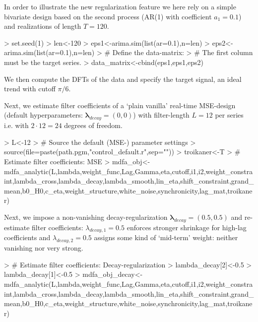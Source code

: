 \documentclass[a4paper]{book}
\begin{document}
In order to illustrate the new regularization feature we here rely on a simple bivariate design based on the second process (AR(1) with coefficient $a_1=0.1$) and realizations of length $T=120$. 
\begin{Schunk}
\begin{Sinput}
> set.seed(1)
> len<-120
> eps1<-arima.sim(list(ar=0.1),n=len)
> eps2<-arima.sim(list(ar=0.1),n=len)
> # Define the data-matrix:
> # The first column must be the target series. 
> data_matrix<-cbind(eps1,eps1,eps2)
\end{Sinput}
\end{Schunk}
We then compute the DFTs of the data and specify the target signal, an ideal trend with cutoff $\pi/6$.
\begin{Schunk}
\end{Schunk}
Next, we estimate filter coefficients of a `plain vanilla' real-time MSE-design (default hyperparameters: $\boldsymbol{\lambda}_{decay}=(0,0)$) with filter-length $L=12$ per series i.e. with $2=24$ degrees of freedom. 
\begin{Schunk}
\begin{Sinput}
> L<-12
> # Source the default (MSE-) parameter settings
> source(file=paste(path.pgm,"control_default.r",sep=""))
> troikaner<-T
> # Estimate filter coefficients: MSE
> mdfa_obj<-mdfa_analytic(L,lambda,weight_func,Lag,Gamma,eta,cutoff,i1,i2,weight_constraint,lambda_cross,lambda_decay,lambda_smooth,lin_eta,shift_constraint,grand_mean,b0_H0,c_eta,weight_structure,white_noise,synchronicity,lag_mat,troikaner)
\end{Sinput}
\end{Schunk}
Next, we  impose a non-vanishing decay-regularization $\boldsymbol{\lambda}_{decay}=(0.5,0.5)$ and re-estimate filter coefficients: $\lambda_{decay,1}=0.5$ enforces stronger shrinkage for high-lag coefficients and $\lambda_{decay,2}=0.5$ assigns some kind of `mid-term' weight: neither vanishing nor very strong. 
\begin{Schunk}
\begin{Sinput}
> # Estimate filter coefficients: Decay-regularization
> lambda_decay[2]<-0.5
> lambda_decay[1]<-0.5
> mdfa_obj_decay<-mdfa_analytic(L,lambda,weight_func,Lag,Gamma,eta,cutoff,i1,i2,weight_constraint,lambda_cross,lambda_decay,lambda_smooth,lin_eta,shift_constraint,grand_mean,b0_H0,c_eta,weight_structure,white_noise,synchronicity,lag_mat,troikaner)
\end{Sinput}
\end{Schunk}
\end{document}
